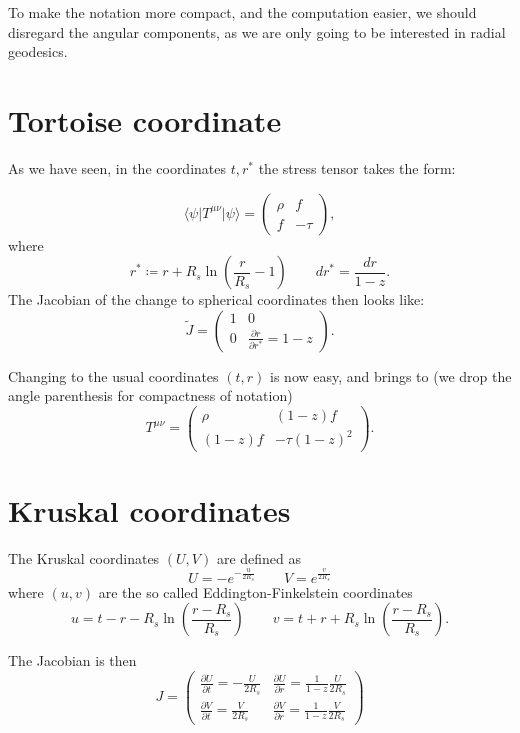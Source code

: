 To make the notation more compact, and the computation easier, we should disregard the angular components, as we are only going to be interested in radial geodesics.

\section{Tortoise coordinate}
As we have seen, in the coordinates \(t, r^*\) the stress tensor takes the form:

\[
    \langle\psi\vert T^{\mu\nu}\vert\psi\rangle = 
    \begin{pmatrix}
        \rho & f \\
        f & -\tau
    \end{pmatrix} ,
\]
where
\[
    r^* \coloneqq r + R_s\ln\left(\frac{r}{R_s} - 1\right)    \quad \quad dr^* = \frac{dr}{1 - z}.
\]
The Jacobian of the change to spherical coordinates then looks like:
\[
\tilde{J} = \begin{pmatrix}
    1 & 0 \\
    0 & \frac{\partial r}{\partial r^*} = 1 - z
\end{pmatrix}.   
\]

Changing to the usual coordinates \((t, r)\) is now easy, and brings to (we drop the angle parenthesis for compactness of notation)
\[
   T^{\mu\nu} = \begin{pmatrix}
    \rho & (1 - z)f \\
    (1 - z)f  & -\tau(1 - z)^2
   \end{pmatrix}.
\]

\section{Kruskal coordinates}
The Kruskal coordinates \((U, V)\) are defined as 
\[
   U = - e^{-\frac{u}{2R_s}} \quad \quad V = e^{\frac{v}{2R_s}}
\]
where \((u,v)\) are the so called Eddington-Finkelstein coordinates
\[
u = t - r - R_s\ln\left(\frac{r - R_s}{R_s}\right)    \quad \quad 
v = t + r + R_s\ln\left(\frac{r - R_s}{R_s}\right).
\]

The Jacobian is then
\[
J = \begin{pmatrix}
    \frac{\partial U}{\partial t} = - \frac{U}{2R_s} & \frac{\partial U}{\partial r} = \frac{1}{1 - z} \frac{U}{2R_s} \\
    \frac{\partial V}{\partial t} = \frac{V}{2R_s} & \frac{\partial V}{\partial r} = \frac{1}{1 - z} \frac{V}{2R_s}
\end{pmatrix}    
\]

